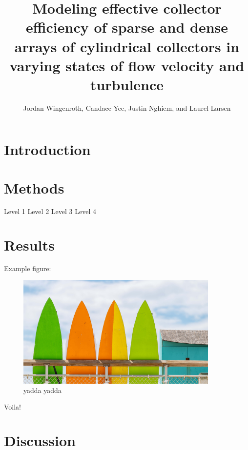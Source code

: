 \documentclass[10pt,a4paper]{article}
\author{Jordan Wingenroth, Candace Yee, Justin Nghiem, and Laurel Larsen}
\title{Modeling effective collector efficiency of sparse and dense arrays of cylindrical collectors in varying states of flow velocity and turbulence}
\begin{document}
\maketitle

\section{Introduction}



\section{Methods}

\begin{outline}
   \1 Level 1 
      \2 Level 2
         \3 Level 3
            \4 Level 4      

\end{outline}

\section{Results}

Example figure:

\begin{figure}[h]
\includegraphics[width=10cm]{example.jpg}
\centering
\caption{yadda yadda}
\end{figure}

Voila!

\section{Discussion}
\end{document}
